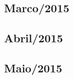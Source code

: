 \documentclass[12pt,a4paper]{article}
\begin{document}
\subsection{Marco/2015}
  
 
\subsection{Abril/2015}
  
  
\subsection{Maio/2015} 
  
  
  
   
%    
%   
%   
%   
%   

%   
%   
%   
% 
%   
%   
%   
%   
% 
%   
%   
%   
% 


\end{document}
